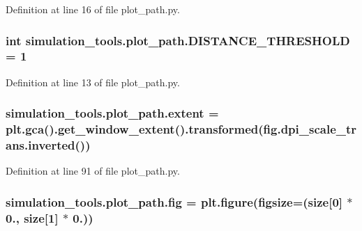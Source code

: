 Definition at line 16 of file plot\+\_\+path.\+py.

\subsubsection[{\texorpdfstring{D\+I\+S\+T\+A\+N\+C\+E\+\_\+\+T\+H\+R\+E\+S\+H\+O\+LD}{DISTANCE_THRESHOLD}}]{\setlength{\rightskip}{0pt plus 5cm}int simulation\+\_\+tools.\+plot\+\_\+path.\+D\+I\+S\+T\+A\+N\+C\+E\+\_\+\+T\+H\+R\+E\+S\+H\+O\+LD = 1}\hypertarget{namespacesimulation__tools_1_1plot__path_afb91f4177ffee5b67bf7f0cc55e7cb03}{}\label{namespacesimulation__tools_1_1plot__path_afb91f4177ffee5b67bf7f0cc55e7cb03}


Definition at line 13 of file plot\+\_\+path.\+py.

\subsubsection[{\texorpdfstring{extent}{extent}}]{\setlength{\rightskip}{0pt plus 5cm}simulation\+\_\+tools.\+plot\+\_\+path.\+extent = plt.\+gca().get\+\_\+window\+\_\+extent().transformed(fig.\+dpi\+\_\+scale\+\_\+trans.\+inverted())}\hypertarget{namespacesimulation__tools_1_1plot__path_a82b549bf292f90a865a5dd4715b3b1d8}{}\label{namespacesimulation__tools_1_1plot__path_a82b549bf292f90a865a5dd4715b3b1d8}


Definition at line 91 of file plot\+\_\+path.\+py.

\subsubsection[{\texorpdfstring{fig}{fig}}]{\setlength{\rightskip}{0pt plus 5cm}simulation\+\_\+tools.\+plot\+\_\+path.\+fig = plt.\+figure(figsize=({\bf size}\mbox{[}0\mbox{]} $\ast$ 0., {\bf size}\mbox{[}1\mbox{]} $\ast$ 0.))}\hypertarget{namespacesimulation__tools_1_1plot__path_a610eb9753d8fff77f2b12abc288a9e98}{}\label{namespacesimulation__tools_1_1plot__path_a610eb9753d8fff77f2b12abc288a9e98}


